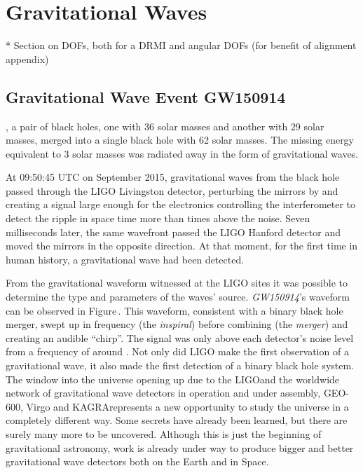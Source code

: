 \chapter{Gravitational Waves}
\label{c:gw-detection}

* Section on DOFs, both for a DRMI and angular DOFs (for benefit of alignment appendix)

\section{Gravitational Wave Event GW150914}
, a pair of black holes, one with 36 solar masses and another with 29 solar masses, merged into a single black hole with 62 solar masses. The missing energy equivalent to 3 solar masses was radiated away in the form of gravitational waves.

At 09:50:45 \gls{UTC} on  September 2015, gravitational waves from the black hole passed through the LIGO Livingston detector, perturbing the mirrors by  and creating a signal large enough for the electronics controlling the interferometer to detect the ripple in space time more than  times above the noise. Seven milliseconds later, the same wavefront passed the LIGO Hanford detector and moved the mirrors in the opposite direction. At that moment, for the first time in human history, a gravitational wave had been detected.

From the gravitational waveform witnessed at the LIGO sites it was possible to determine the type and parameters of the waves' source. \emph{GW150914}'s waveform can be observed in Figure\,. This waveform, consistent with a binary black hole merger, swept up in frequency (the \emph{inspiral}) before combining (the \emph{merger}) and creating an audible ``chirp''. The signal was only above each detector's noise level from a frequency of around . Not only did LIGO make the first observation of a gravitational wave, it also made the first detection of a binary black hole system. The window into the universe opening up due to the LIGO\textemdash and the worldwide network of gravitational wave detectors in operation and under assembly, GEO-600, Virgo and KAGRA\textemdash represents a new opportunity to study the universe in a completely different way. Some secrets have already been learned, but there are surely many more to be uncovered. Although this is just the beginning of gravitational astronomy, work is already under way to produce bigger and better gravitational wave detectors both on the Earth and in Space.

